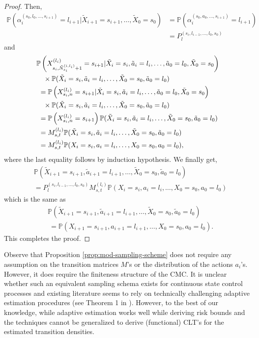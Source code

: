 \documentclass[twoside,11pt]{article}
\newcommand{\pow}[1]{^{(#1)}}%
\numberwithin{equation}{section}
\newcommand{\lp}{\left(}
\newcommand{\rp}{\right)}
\newcommand{\Pbb}{\mathbb{P}}
\newcommand{\prob}{\Pbb}
\begin{document}
\begin{proof}
Then,
\begin{align*}
    \prob\lp  \alpha_i\pow{s_0,l_0,\dots,s_{i+1}}=l_{i+1}| \tilde X_{i+1}=s_{i+1},\dots,\tilde X_0=s_0\rp & = \prob\lp \alpha_i\pow{s_0,a_0,\dots,s_{i+1}}=l_{i+1}\rp\\
    & =  P_l\pow{s_i,l_{i-1},\dots,l_0,s_0} 
\end{align*}
and
\begin{align*}
    &  \prob\lp X_{s_i,\Tilde{N}_{s_i}^{(i,l_i)}+1}\pow{l_i}=s_{i+1}|\tilde X_i=s_i,\tilde a_{i}=l_i,\dots,\tilde a_0=l_0,\tilde X_0=s_0\rp\\
    &\quad \times \prob(\tilde X_i=s_i,\tilde a_i=l_i,\dots,\tilde X_0=s_0,\tilde a_0=l_0)\\
    &  \ =  \prob\lp X_{s_i,n}\pow{l_i}=s_{i+1}|\tilde X_i=s_i,\tilde a_{i}=l_i,\dots,\tilde a_0=l_0,\tilde X_0=s_0\rp\\
    &\quad \times \prob(\tilde X_i=s_i,\tilde a_i=l_i,\dots,\tilde X_0=s_0,\tilde a_0=l_0)\\
    &  \ =\prob\lp X_{s_i,n}\pow{l_i}=s_{i+1}\rp \prob(\tilde X_i=s_i,\tilde a_i=l_i,\dots,\tilde X_0=s_0,\tilde a_0=l_0)\\
    &\ = M_{s,t}\pow{l_i}\prob(\tilde X_i=s_i,\tilde a_i=l_i,\dots,\tilde X_0=s_0,\tilde a_0=l_0)\\
    &\ =M_{s,t}\pow{l_i}\prob(X_i=s_i, a_i=l_i,\dots,X_0=s_0, a_0=l_0),
\end{align*}
where the last equality follows by induction hypothesis. We finally get,
\begin{align*}
   & \prob\lp \tilde X_{i+1}=s_{i+1},\tilde a_{i+1}=l_{i+1},\dots,\tilde X_0=s_0,\tilde a_0=l_0 \rp \\
   & =  P_l\pow{s_i,l_{i-1},\dots,l_0,s_0} M_{s,t}\pow{l_i}\prob(X_i=s_i, a_i=l_i,\dots,X_0=s_0, a_0=l_0)
\end{align*}
which is the same as 
\begin{align*}
   &\prob\lp \tilde X_{i+1}=s_{i+1},\tilde a_{i+1}=l_{i+1},\dots,\tilde X_0=s_0,\tilde a_0=l_0 \rp \\ 
   &\ = \prob\lp  X_{i+1}=s_{i+1}, a_{i+1}=l_{i+1},\dots, X_0=s_0, a_0=l_0 \rp. 
\end{align*}
This completes the proof.
\end{proof}
Observe that Proposition \ref{prop:mod-sampling-scheme} does not require any assumption on the transition matrices $M$'s or the distribution of the actions $a_i$'s. However, it does require the finiteness structure of the CMC. It is unclear whether such an equivalent sampling schema exists for continuous state control processes and existing literature seems to rely on technically challenging adaptive estimation procedures (see Theorem 1 in \cite{banerjee2025adaptiveestimationtransitiondensity}). However, to the best of our knowledge, while adaptive estimation works well while deriving risk bounds \cite[etc.]{birge_model_2006,baraud_estimating_2009,baraud_rho-estimators_2018} and the techniques cannot be generalized to derive (functional) CLT's for the estimated transition densities. 
\end{document}

